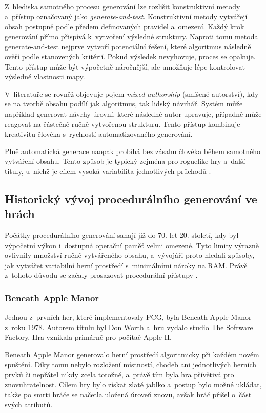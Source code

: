 \documentclass[
   program=itk,
   biblatex,
   figures=true,
   tables=true,
   glossaries,
   index
]{kidiplom}
\begin{document}
Z~hlediska samotného procesu generování lze rozlišit konstruktivní metody a~přístup označovaný jako \textit{generate-and-test}. Konstruktivní metody vytvářejí obsah postupně podle předem definovaných pravidel a~omezení. Každý krok generování přímo přispívá k~vytvoření výsledné struktury. Naproti tomu metoda generate-and-test nejprve vytvoří potenciální řešení, které algoritmus následně ověří podle stanovených kritérií. Pokud výsledek nevyhovuje, proces se opakuje. Tento přístup může být výpočetně náročnější, ale umožňuje lépe kontrolovat výsledné vlastnosti mapy.

V~literatuře se rovněž objevuje pojem \textit{mixed-authorship} (smíšené autorství), kdy se na tvorbě obsahu podílí jak algoritmus, tak lidský návrhář. Systém může například generovat návrhy úrovní, které následně autor upravuje, případně může reagovat na částečně ručně vytvořenou strukturu. Tento přístup kombinuje kreativitu člověka s~rychlostí automatizovaného generování.

Plně automatická generace naopak probíhá bez zásahu člověka během samotného vytváření obsahu. Tento způsob je typický zejména pro roguelike hry a~další tituly, u~nichž je cílem vysoká variabilita jednotlivých průchodů \cite{Shaker2016}.

\subsection{Historický vývoj procedurálního generování ve hrách}
Počátky procedurálního generování sahají již do 70. let 20. století, kdy byl výpočetní výkon i~dostupná operační paměť velmi omezené. Tyto limity výrazně ovlivnily množství ručně vytvářeného obsahu, a~vývojáři proto hledali způsoby, jak vytvářet variabilní herní prostředí s~minimálními nároky na RAM. Právě z~tohoto důvodu se začaly prosazovat procedurální přístupy \cite{Shaker2016}.

\subsubsection{Beneath Apple Manor}
Jednou z~prvních her, které implementovaly PCG, byla Beneath Apple Manor z~roku 1978. Autorem titulu byl Don Worth a~hru vydalo studio The Software Factory. Hra vznikala primárně pro počítač Apple II.

Beneath Apple Manor generovalo herní prostředí algoritmicky při každém novém spuštění. Díky tomu nebylo rozložení místností, chodeb ani jednotlivých herních prvků či nepřátel nikdy zcela totožné, a~právě tím byla hra přívětivá pro znovuhratelnost. Cílem hry bylo získat zlaté jablko a~postup bylo možné ukládat, takže po smrti hráče se načetla uložená úroveň znovu, avšak hráč přišel o~část svých atributů.
\end{document}
